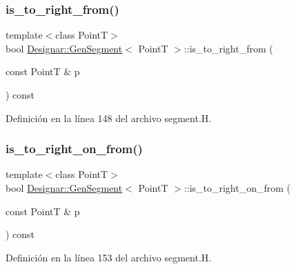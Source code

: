 \subsubsection{\texorpdfstring{is\+\_\+to\+\_\+right\+\_\+from()}{is\_to\_right\_from()}}
{\footnotesize\ttfamily template$<$class PointT$>$ \\
bool \hyperlink{class_designar_1_1_gen_segment}{Designar\+::\+Gen\+Segment}$<$ PointT $>$\+::is\+\_\+to\+\_\+right\+\_\+from (\begin{DoxyParamCaption}\item[{const PointT \&}]{p }\end{DoxyParamCaption}) const\hspace{0.3cm}{\ttfamily [inline]}}



Definición en la línea 148 del archivo segment.\+H.

\mbox{\label{class_designar_1_1_gen_segment_a7d2d5e4b54fa16fd953de345394e331b}} 
\subsubsection{\texorpdfstring{is\+\_\+to\+\_\+right\+\_\+on\+\_\+from()}{is\_to\_right\_on\_from()}}
{\footnotesize\ttfamily template$<$class PointT$>$ \\
bool \hyperlink{class_designar_1_1_gen_segment}{Designar\+::\+Gen\+Segment}$<$ PointT $>$\+::is\+\_\+to\+\_\+right\+\_\+on\+\_\+from (\begin{DoxyParamCaption}\item[{const PointT \&}]{p }\end{DoxyParamCaption}) const\hspace{0.3cm}{\ttfamily [inline]}}



Definición en la línea 153 del archivo segment.\+H.

\mbox{\label{class_designar_1_1_gen_segment_a9878c3c77157f54bf99ba33381bf0a5e}} 
